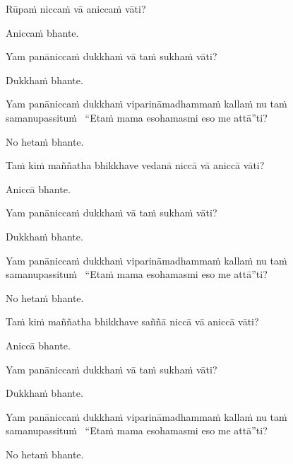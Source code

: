 \begin{pali-hang}
  Rūpaṁ niccaṁ vā aniccaṁ vāti?
\end{pali-hang}
\begin{pali-hangtogether}
  Aniccaṁ bhante.
\end{pali-hangtogether}
\begin{pali-hangtogether}
  Yam panāniccaṁ dukkhaṁ vā taṁ sukhaṁ vāti?
\end{pali-hangtogether}
\begin{pali-hangtogether}
  Dukkhaṁ bhante.
\end{pali-hangtogether}
\begin{pali-hangtogether}
  Yam panāniccaṁ dukkhaṁ viparināmadhammaṁ kallaṁ nu taṁ samanupassituṁ \breathmark\ ``Etaṁ mama esohamasmi eso me attā''ti?
\end{pali-hangtogether}
\begin{pali-hangtogether}
  No hetaṁ bhante.
\end{pali-hangtogether}

\begin{pali-hang}
  Taṁ kiṁ maññatha bhikkhave vedanā niccā vā aniccā vāti?
\end{pali-hang}
\begin{pali-hangtogether}
  Aniccā bhante.
\end{pali-hangtogether}
\begin{pali-hangtogether}
  Yam panāniccaṁ dukkhaṁ vā taṁ sukhaṁ vāti?
\end{pali-hangtogether}
\begin{pali-hangtogether}
  Dukkhaṁ bhante.
\end{pali-hangtogether}
\begin{pali-hangtogether}
  Yam panāniccaṁ dukkhaṁ viparināmadhammaṁ kallaṁ nu taṁ samanupassituṁ \breathmark\ ``Etaṁ mama esohamasmi eso me attā''ti?
\end{pali-hangtogether}
\begin{pali-hangtogether}
  No hetaṁ bhante.
\end{pali-hangtogether}

\begin{pali-hang}
  Taṁ kiṁ maññatha bhikkhave saññā niccā vā aniccā vāti?
\end{pali-hang}
\begin{pali-hangtogether}
  Aniccā bhante.
\end{pali-hangtogether}
\begin{pali-hangtogether}
  Yam panāniccaṁ dukkhaṁ vā taṁ sukhaṁ vāti?
\end{pali-hangtogether}
\begin{pali-hangtogether}
  Dukkhaṁ bhante.
\end{pali-hangtogether}
\begin{pali-hangtogether}
  Yam panāniccaṁ dukkhaṁ viparināmadhammaṁ kallaṁ nu taṁ samanupassituṁ \breathmark\ ``Etaṁ mama esohamasmi eso me attā''ti?
\end{pali-hangtogether}
\begin{pali-hangtogether}
  No hetaṁ bhante.
\end{pali-hangtogether}

